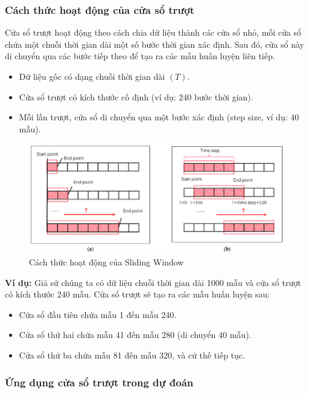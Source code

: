\subsubsection{Cách thức hoạt động của cửa sổ trượt}

Cửa sổ trượt hoạt động theo cách chia dữ liệu thành các cửa sổ nhỏ, mỗi cửa sổ chứa một chuỗi thời gian dài một số bước thời gian xác định. Sau đó, cửa sổ này di chuyển qua các bước tiếp theo để tạo ra các mẫu huấn luyện liên tiếp.

\begin{itemize}
    \item Dữ liệu gốc có dạng chuỗi thời gian dài $(T)$.
    \item Cửa sổ trượt có kích thước cố định (ví dụ: 240 bước thời gian).
    \item Mỗi lần trượt, cửa sổ di chuyển qua một bước xác định (step size, ví dụ: 40 mẫu).
\end{itemize}

\begin{figure}[H]
    \centering
    \includegraphics[width=\textwidth,height=\textheight,keepaspectratio]{Images/Improved methods/sliding-window-method.png}
    \caption{Cách thức hoạt động của Sliding Window}
    \label{fig:enter-label}
\end{figure}

\textbf{Ví dụ:}  
Giả sử chúng ta có dữ liệu chuỗi thời gian dài 1000 mẫu và cửa sổ trượt có kích thước 240 mẫu. Cửa sổ trượt sẽ tạo ra các mẫu huấn luyện sau:
\begin{itemize}
    \item Cửa sổ đầu tiên chứa mẫu 1 đến mẫu 240.
    \item Cửa sổ thứ hai chứa mẫu 41 đến mẫu 280 (di chuyển 40 mẫu).
    \item Cửa sổ thứ ba chứa mẫu 81 đến mẫu 320, và cứ thế tiếp tục.
\end{itemize}

\subsubsection{Ứng dụng cửa sổ trượt trong dự đoán}

